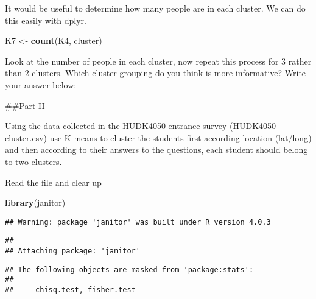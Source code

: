 \documentclass[
]{article}
\newenvironment{Shaded}{\begin{snugshade}}{\end{snugshade}}
\newcommand{\CommentTok}[1]{\textcolor[rgb]{0.56,0.35,0.01}{\textit{#1}}}
\newcommand{\DataTypeTok}[1]{\textcolor[rgb]{0.13,0.29,0.53}{#1}}
\newcommand{\KeywordTok}[1]{\textcolor[rgb]{0.13,0.29,0.53}{\textbf{#1}}}
\newcommand{\NormalTok}[1]{#1}
\newcommand{\OperatorTok}[1]{\textcolor[rgb]{0.81,0.36,0.00}{\textbf{#1}}}
\newcommand{\OtherTok}[1]{\textcolor[rgb]{0.56,0.35,0.01}{#1}}
\newcommand{\StringTok}[1]{\textcolor[rgb]{0.31,0.60,0.02}{#1}}
\begin{document}
It would be useful to determine how many people are in each cluster. We
can do this easily with dplyr.

\begin{Shaded}
\begin{Highlighting}[]
\NormalTok{K7 <-}\StringTok{ }\KeywordTok{count}\NormalTok{(K4, cluster)}
\end{Highlighting}
\end{Shaded}

Look at the number of people in each cluster, now repeat this process
for 3 rather than 2 clusters. Which cluster grouping do you think is
more informative? Write your answer below:

\#\#Part II

Using the data collected in the HUDK4050 entrance survey
(HUDK4050-cluster.csv) use K-means to cluster the students first
according location (lat/long) and then according to their answers to the
questions, each student should belong to two clusters.

Read the file and clear up

\begin{Shaded}
\begin{Highlighting}[]
\KeywordTok{library}\NormalTok{(janitor)}
\end{Highlighting}
\end{Shaded}

\begin{verbatim}
## Warning: package 'janitor' was built under R version 4.0.3
\end{verbatim}

\begin{verbatim}
## 
## Attaching package: 'janitor'
\end{verbatim}

\begin{verbatim}
## The following objects are masked from 'package:stats':
## 
##     chisq.test, fisher.test
\end{verbatim}

\begin{Shaded}
\end{Shaded}
\end{document}
